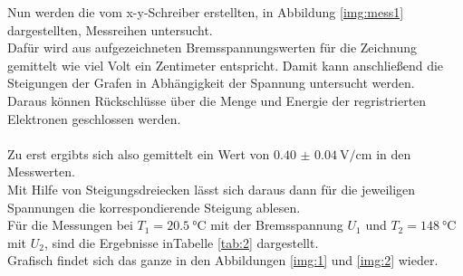 \noindent
Nun werden die vom x-y-Schreiber erstellten, in Abbildung \ref{img:mess1} dargestellten, Messreihen untersucht.\\
Dafür wird aus aufgezeichneten Bremsspannungswerten für die Zeichnung gemittelt wie viel Volt ein Zentimeter entspricht.
Damit kann anschließend die Steigungen der Grafen in Abhängigkeit der Spannung untersucht werden.\\
Daraus können Rückschlüsse über die Menge und Energie der regristrierten Elektronen geschlossen werden.\\\\
Zu erst ergibts sich also gemittelt ein Wert von $\SI{0.40(4)}{\volt\per\centi\metre}$ in den Messwerten.\\
Mit Hilfe von Steigungsdreiecken lässt sich daraus dann für die jeweiligen Spannungen die korrespondierende Steigung ablesen.\\
Für die Messungen bei $T_1=\SI{20.5}{\celsius}$ mit der Bremsspannung $U_1$ und $T_2=\SI{148}{\celsius}$ mit $U_2$, sind die Ergebnisse inTabelle \ref{tab:2} dargestellt.\\
Grafisch findet sich das ganze in den Abbildungen \ref{img:1} und \ref{img:2} wieder.


